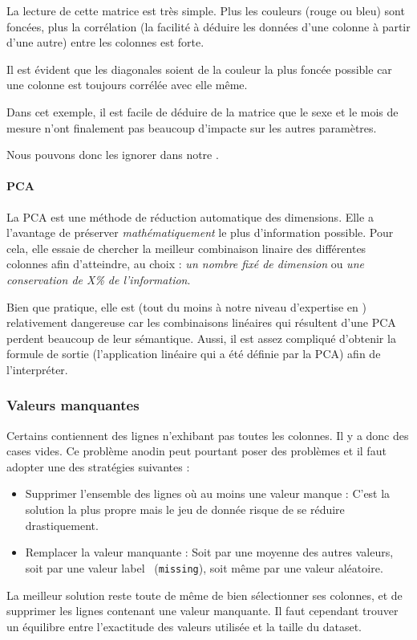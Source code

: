 La lecture de cette matrice est très simple. Plus les couleurs (rouge ou bleu) sont foncées, plus la corrélation (\ie la facilité à déduire les données d'une colonne à partir d'une autre) entre les colonnes est forte. 

Il est évident que les diagonales soient de la couleur la plus foncée possible car une colonne est toujours corrélée avec elle même.

Dans cet exemple, il est facile de déduire de la matrice que le sexe et le mois de mesure n'ont finalement pas beaucoup d'impacte sur les autres paramètres. 

Nous pouvons donc les ignorer dans notre .

\paragraph{PCA}
La \gls{PCA} est une méthode de réduction automatique des dimensions. Elle a l'avantage de préserver \textsl{mathématiquement} le plus d'information possible. Pour cela, elle essaie de chercher la meilleur combinaison linaire des différentes colonnes afin d'atteindre, au choix : \emph{un nombre fixé de dimension} ou \emph{une conservation de X\% de l'information}.

Bien que pratique, elle est (tout du moins à notre niveau d'expertise en ) relativement dangereuse car les combinaisons linéaires qui résultent d'une \gls{PCA} perdent beaucoup de leur sémantique. Aussi, il est assez compliqué d'obtenir la formule de sortie (\ie l'application linéaire qui a été définie par la \gls{PCA}) afin de l'interpréter.

\subsubsection{Valeurs manquantes}
Certains  contiennent des lignes n'exhibant pas toutes les colonnes. Il y a donc \og des cases vides\fg. Ce problème anodin peut pourtant poser des problèmes et il faut adopter une des stratégies suivantes :
\begin{itemize}
	\item Supprimer l'ensemble des lignes où au moins une valeur manque : C'est la solution la plus propre mais le jeu de donnée risque de se réduire drastiquement.
	\item Remplacer la valeur manquante : Soit par une moyenne des autres valeurs, soit par une valeur \og label\fg~ (\eg \texttt{missing}), soit même par une valeur aléatoire.
\end{itemize}
La meilleur solution reste toute de même de bien sélectionner ses colonnes, et de supprimer les lignes contenant une valeur manquante. Il faut cependant trouver un équilibre entre l'exactitude des valeurs utilisée et la taille du \gls{dataset}.

